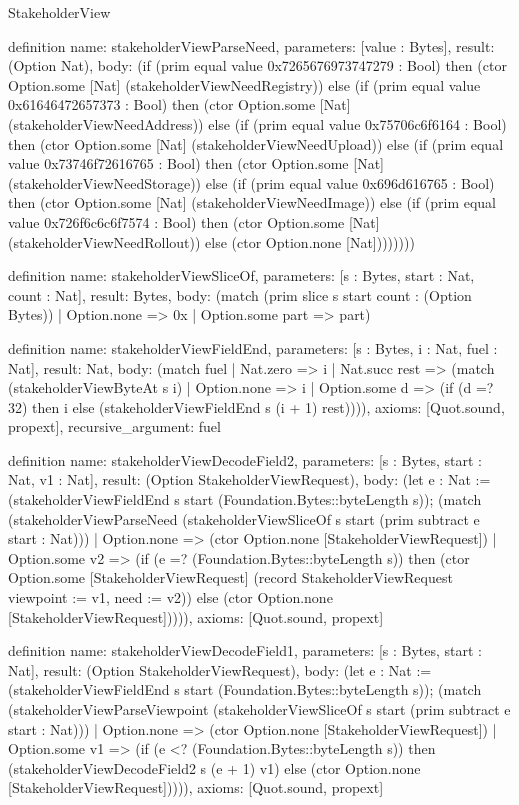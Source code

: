 \begin{lexlean}{StakeholderView}
\begin{semanticmodule}
definition{
  name: stakeholderViewParseNeed,
  parameters: [value : Bytes],
  result: (Option Nat),
  body: (if (prim equal value 0x7265676973747279 : Bool) then (ctor Option.some [Nat] (stakeholderViewNeedRegistry)) else (if (prim equal value 0x61646472657373 : Bool) then (ctor Option.some [Nat] (stakeholderViewNeedAddress)) else (if (prim equal value 0x75706c6f6164 : Bool) then (ctor Option.some [Nat] (stakeholderViewNeedUpload)) else (if (prim equal value 0x73746f72616765 : Bool) then (ctor Option.some [Nat] (stakeholderViewNeedStorage)) else (if (prim equal value 0x696d616765 : Bool) then (ctor Option.some [Nat] (stakeholderViewNeedImage)) else (if (prim equal value 0x726f6c6c6f7574 : Bool) then (ctor Option.some [Nat] (stakeholderViewNeedRollout)) else (ctor Option.none [Nat])))))))
}

definition{
  name: stakeholderViewSliceOf,
  parameters: [s : Bytes, start : Nat, count : Nat],
  result: Bytes,
  body: (match (prim slice s start count : (Option Bytes))
    | Option.none => 0x
    | Option.some part => part)
}

definition{
  name: stakeholderViewFieldEnd,
  parameters: [s : Bytes, i : Nat, fuel : Nat],
  result: Nat,
  body: (match fuel
    | Nat.zero => i
    | Nat.succ rest => (match (stakeholderViewByteAt s i)
      | Option.none => i
      | Option.some d => (if (d =? 32) then i else (stakeholderViewFieldEnd s (i + 1) rest)))),
  axioms: [Quot.sound, propext],
  recursive_argument: fuel
}

definition{
  name: stakeholderViewDecodeField2,
  parameters: [s : Bytes, start : Nat, v1 : Nat],
  result: (Option StakeholderViewRequest),
  body: (let e : Nat := (stakeholderViewFieldEnd s start (Foundation.Bytes::byteLength s)); (match (stakeholderViewParseNeed (stakeholderViewSliceOf s start (prim subtract e start : Nat)))
    | Option.none => (ctor Option.none [StakeholderViewRequest])
    | Option.some v2 => (if (e =? (Foundation.Bytes::byteLength s)) then (ctor Option.some [StakeholderViewRequest] (record StakeholderViewRequest {viewpoint := v1, need := v2})) else (ctor Option.none [StakeholderViewRequest])))),
  axioms: [Quot.sound, propext]
}

definition{
  name: stakeholderViewDecodeField1,
  parameters: [s : Bytes, start : Nat],
  result: (Option StakeholderViewRequest),
  body: (let e : Nat := (stakeholderViewFieldEnd s start (Foundation.Bytes::byteLength s)); (match (stakeholderViewParseViewpoint (stakeholderViewSliceOf s start (prim subtract e start : Nat)))
    | Option.none => (ctor Option.none [StakeholderViewRequest])
    | Option.some v1 => (if (e <? (Foundation.Bytes::byteLength s)) then (stakeholderViewDecodeField2 s (e + 1) v1) else (ctor Option.none [StakeholderViewRequest])))),
  axioms: [Quot.sound, propext]
}


\end{semanticmodule}
\end{lexlean}
